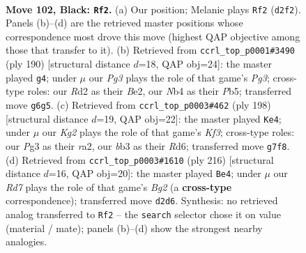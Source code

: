 \documentclass[11pt]{article}
\begin{document}
\clearpage

\begin{figure}[p]\centering
\begin{subfigure}{0.46\textwidth}\centering
\resizebox{\linewidth}{!}{%
\newchessgame
\chessboard[
  setfen={8/5pk1/6p1/4P3/1n3P2/1B4p1/3r4/6K1 b - - 3 102},
  showmover=false,
  pgfstyle=straightmove, color=movearrow, markmove={d2-f2}
]}
\caption{}
\end{subfigure}\hfill
\begin{subfigure}{0.46\textwidth}\centering
\resizebox{\linewidth}{!}{%
\newchessgame
\chessboard[
  setfen={3b4/8/6pk/1P3p2/7P/6PK/4B3/8 w - - 13 96},
  showmover=false,
  pgfstyle=straightmove, color=movearrow, markmove={g3-g4}
]}
\caption{}
\end{subfigure}
\\[4pt]
\begin{subfigure}{0.46\textwidth}\centering
\resizebox{\linewidth}{!}{%
\newchessgame
\chessboard[
  setfen={8/5p1k/3R3p/7P/5PP1/5K2/r7/8 w - - 5 100},
  showmover=false,
  pgfstyle=straightmove, color=movearrow, markmove={f3-e4}
]}
\caption{}
\end{subfigure}\hfill
\begin{subfigure}{0.46\textwidth}\centering
\resizebox{\linewidth}{!}{%
\newchessgame
\chessboard[
  setfen={8/8/1k1p1b2/3P4/1P3p2/1KP5/6B1/8 w - - 23 109},
  showmover=false,
  pgfstyle=straightmove, color=movearrow, markmove={g2-e4}
]}
\caption{}
\end{subfigure}
\caption{\textbf{Move 102, Black: \texttt{Rf2}.} (a) Our position; Melanie plays \texttt{Rf2} (\texttt{d2f2}). Panels (b)--(d) are the retrieved master positions whose correspondence most drove this move (highest QAP objective among those that transfer to it). (b) Retrieved from \texttt{ccrl\_top\_p0001\#3490} (ply 190) [structural distance $d$=18, QAP obj=24]: the master played \texttt{g4}; under $\mu$ our \emph{Pg3} plays the role of that game's \emph{Pg3}; cross-type roles: our \emph{R}d2 as their \emph{B}e2, our \emph{N}b4 as their \emph{P}b5; transferred move \texttt{g6g5}. (c) Retrieved from \texttt{ccrl\_top\_p0003\#462} (ply 198) [structural distance $d$=19, QAP obj=22]: the master played \texttt{Ke4}; under $\mu$ our \emph{Kg2} plays the role of that game's \emph{Kf3}; cross-type roles: our \emph{P}g3 as their \emph{r}a2, our \emph{b}b3 as their \emph{R}d6; transferred move \texttt{g7f8}. (d) Retrieved from \texttt{ccrl\_top\_p0003\#1610} (ply 216) [structural distance $d$=16, QAP obj=20]: the master played \texttt{Be4}; under $\mu$ our \emph{Rd7} plays the role of that game's \emph{Bg2} (a \textbf{cross-type} correspondence); transferred move \texttt{d2d6}. Synthesis: no retrieved analog transferred to \texttt{Rf2} -- the \texttt{search} selector chose it on value (material / mate); panels (b)--(d) show the strongest nearby analogies.}
\label{fig:thought-m203}
\end{figure}
\end{document}
